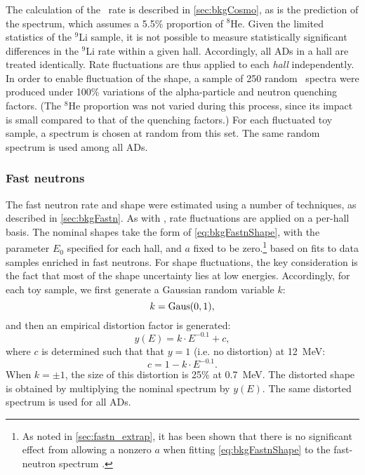 \documentclass[../thesis.tex]{subfiles}
\begin{document}
\subsubsection{\LiHe}

The calculation of the \LiHe\ rate is described in \autoref{sec:bkgCosmo}, as is the prediction of the spectrum, which assumes a 5.5\% proportion of $^8$He. Given the limited statistics of the $^9$Li sample, it is not possible to measure statistically significant differences in the $^9$Li rate within a given hall. Accordingly, all ADs in a hall are treated identically. Rate fluctuations are thus applied to each \emph{hall} independently. In order to enable fluctuation of the shape, a sample of 250 random \LiHe\ spectra were produced under 100\% variations of the alpha-particle and neutron quenching factors. (The $^8$He proportion was not varied during this process, since its impact is small compared to that of the quenching factors.) For each fluctuated toy sample, a spectrum is chosen at random from this set. The same random spectrum is used among all ADs.

\subsubsection{Fast neutrons}

The fast neutron rate and shape were estimated using a number of techniques, as described in \autoref{sec:bkgFastn}. As with \LiHe, rate fluctuations are applied on a per-hall basis. The nominal shapes take the form of \autoref{eq:bkgFastnShape}, with the parameter $E_0$ specified for each hall, and $a$ fixed to be zero.\footnote{As noted in \autoref{sec:fastn_extrap}, it has been shown that there is no significant effect from allowing a nonzero $a$ when fitting \autoref{eq:bkgFastnShape} to the fast-neutron spectrum \cite{fastn}.} based on fits to data samples enriched in fast neutrons. For shape fluctuations, the key consideration is the fact that most of the shape uncertainty lies at low energies. Accordingly, for each toy sample, we first generate a Gaussian random variable $k$:
\begin{equation}
  k = \operatorname{Gaus}(0,1),
\end{equation}
and then an empirical distortion factor is generated:
\begin{equation}
  y(E) = k \cdot E^{-0.1} + c,
\end{equation}
where $c$ is determined such that that $y = 1$ (i.e. no distortion) at 12~MeV:
\begin{equation}
  c = 1 - k \cdot E^{-0.1}.
\end{equation}
When $k = \pm1$, the size of this distortion is 25\% at 0.7~MeV. The distorted shape is obtained by multiplying the nominal spectrum by $y(E)$. The same distorted spectrum is used for all ADs.
\end{document}
